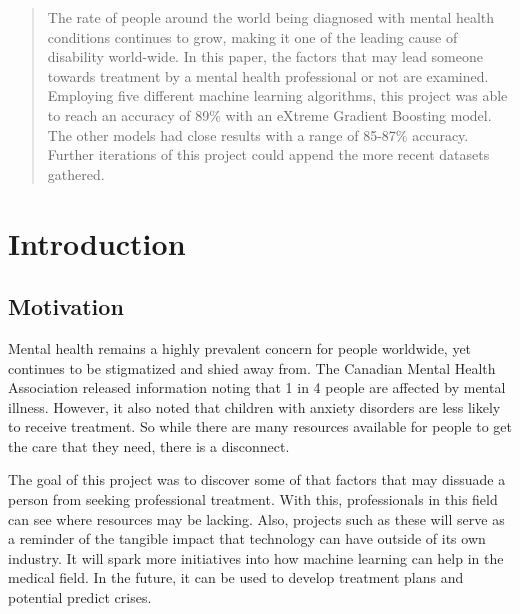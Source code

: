 \documentclass{article}
\begin{document}
 


\begin{abstract} 
The rate of people around the world being diagnosed with mental health conditions continues to grow, making it one of the leading cause of disability world-wide. In this paper, the factors that may lead someone towards treatment by a mental health professional or not are examined. Employing five different machine learning algorithms, this project was able to reach an accuracy of 89\% with an eXtreme Gradient Boosting model. The other models had close results with a range of 85-87\% accuracy. Further iterations of this project could append the more recent datasets gathered.
\end{abstract} 


\section{Introduction}

\subsection{Motivation}

Mental health remains a highly prevalent concern for people worldwide, yet continues to be stigmatized and shied away from. The Canadian Mental Health Association released information noting that 1 in 4 people are affected by mental illness. However, it also noted that children with anxiety disorders are less likely to receive treatment. So while there are many resources available for people to get the care that they need, there is a disconnect. 

The goal of this project was to discover some of that factors that may dissuade a person from seeking professional treatment. With this, professionals in this field can see where resources may be lacking. Also, projects such as these will serve as a reminder of the tangible impact that technology can have outside of its own industry. It will spark more initiatives into how machine learning can help in the medical field. In the future, it can be used to develop treatment plans and potential predict crises. 
\end{document}

